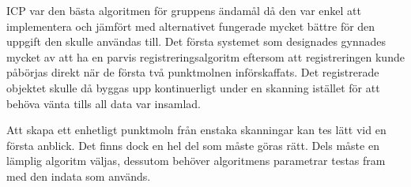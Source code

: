 ICP var den bästa algoritmen för gruppens ändamål då den var enkel att implementera och jämfört med alternativet fungerade mycket bättre för den uppgift den skulle användas till. Det första systemet som designades gynnades mycket av att ha en parvis registreringsalgoritm eftersom att registreringen kunde påbörjas direkt när de första två punktmolnen införskaffats. Det registrerade objektet skulle då byggas upp kontinuerligt under en skanning istället för att behöva vänta tills all data var insamlad.

Att skapa ett enhetligt punktmoln från enstaka skanningar kan tes lätt vid en första anblick. Det finns dock en hel del som måste göras rätt. Dels måste en lämplig algoritm väljas, dessutom behöver algoritmens parametrar testas fram med den indata som används.


